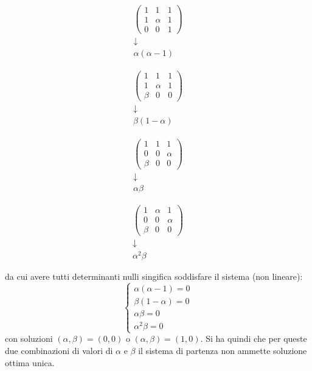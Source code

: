 \documentclass[a4paper,11pt]{article}
\begin{document}
\begin{enumerate}
\noindent
\begin{minipage}{0.22\textwidth}
$$
\begin{array}{c}
\begin{pmatrix}
	1 & 1 & 1 \\
	1 & \alpha & 1 \\
	0 & 0 & 1
\end{pmatrix} \\ 
\downarrow \\
\alpha(\alpha - 1)
\end{array}
$$
\end{minipage}
\begin{minipage}{0.22\textwidth}
$$
\begin{array}{c}
\begin{pmatrix}
	1 & 1 & 1 \\
	1 & \alpha & 1 \\
	\beta & 0 & 0
\end{pmatrix} \\ 
\downarrow \\
\beta(1 - \alpha)
\end{array}
$$
\end{minipage}
\begin{minipage}{0.22\textwidth}
$$
\begin{array}{c}
\begin{pmatrix}
	1 & 1 & 1 \\
	0 & 0 & \alpha \\
	\beta & 0 & 0
\end{pmatrix} \\ 
\downarrow \\
\alpha \beta
\end{array}
$$
\end{minipage}
\begin{minipage}{0.22\textwidth}
$$
\begin{array}{c}
\begin{pmatrix}
	1 & \alpha & 1 \\
	0 & 0 & \alpha \\
	\beta & 0 & 0
\end{pmatrix} \\ 
\downarrow \\
\alpha^2 \beta
\end{array}
$$
\end{minipage}
\par\bigskip
da cui avere tutti determinanti nulli singifica soddisfare il sistema (non lineare):
\[
	\begin{cases}
		\alpha(\alpha - 1) = 0 \\
		\beta(1 - \alpha) = 0 \\ 
		\alpha \beta = 0 \\
		\alpha^2 \beta = 0
	\end{cases}
\]
con soluzioni $(\alpha, \beta) = (0, 0)$ o $(\alpha, \beta) = (1, 0)$.
Si ha quindi che per queste due combinazioni di valori di $\alpha$ e $\beta$ il sistema di partenza non ammette soluzione ottima unica.
\end{enumerate}
\end{document}
